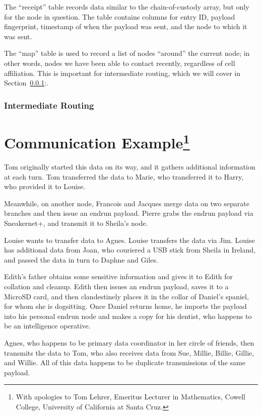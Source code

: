 \documentclass[12pt]{article}
\begin{document}
  The ``receipt'' table records data similar to the chain-of-custody array, but only for the node in question. The table contains columns for entry ID, payload fingerprint, timestamp of when the payload was sent, and the node to which it was sent.
  
  The ``map'' table is used to record a list of nodes ``around'' the current node; in other words, nodes we have been able to contact recently, regardless of cell affiliation. This is important for intermediate routing, which we will cover in Section~\ref{subsec:introuting}:. 
  
 
  \subsubsection{Intermediate Routing}
  \label{subsec:introuting}

  
  \section{Communication Example\footnote{With apologies to Tom Lehrer, Emeritus Lecturer in Mathematics, Cowell College, University of California at Santa Cruz.}}
  
  Tom originally started this data on its way, and it gathers additional information at each turn. Tom transferred the data to Marie, who transferred it to Harry, who provided it to Louise.
  
  Meanwhile, on another node, Francois and Jacques merge data on two separate branches and then issue an endrun payload. Pierre grabs the endrun payload via Sneakernet+, and transmit it to Sheila's node.
  
  Louise wants to transfer data to Agnes. Louise transfers the data via Jim. Louise has additional data from Joan, who couriered a USB stick from Sheila in Ireland, and passed the data in turn to Daphne and Giles.
  
  Edith's father obtains some sensitive information and gives it to Edith for collation and cleanup. Edith then issues an endrun payload, saves it to a MicroSD card, and then clandestinely places it in the collar of Daniel's spaniel, for whom she is dogsitting. Once Daniel returns home, he imports the payload into his personal endrun node and makes a copy for his dentist, who happens to be an intelligence operative.
  
  Agnes, who happens to be primary data coordinator in her circle of friends, then transmits the data to Tom, who also receives data from Sue, Millie, Billie, Gillie, and Willie. All of this data happens to be duplicate transmissions of the same payload.
  
\end{document}
